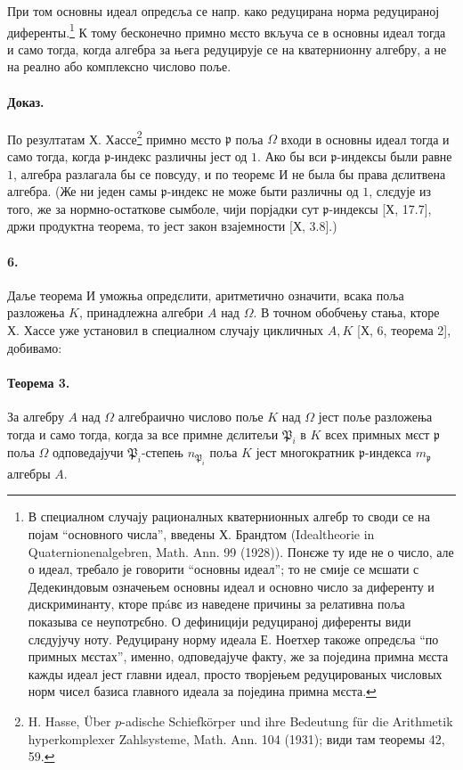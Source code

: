 \documentclass[11pt]{article}
\newcommand{\foreign}[1]{#1}
\begin{document}
При том основны идеал опредєља се напр. како редуцирана норма редуцираној диференты.\footnote{В специалном случају рационалных кватернионных алгебр то своди се на појам ``основного числа'', введены Х. Брандтом (\foreign{Idealtheorie in Quaternionenalgebren, Math. Ann. 99 (1928)}). Понєже ту иде не о число, але о идеал, требало је говорити ``основны идеал''; то не смије се мєшати с Дедекиндовым означењем основны идеал и основно число за диференту и дискриминанту, кторе прáвє из наведене причины за релативна поља показыва се неупотрєбно. О дефиницији редуцираној диференты види слєдујучу ноту. Редуцирану норму идеала Е. Ноетхер такоже опредєља ``по примных мєстах'', именно, одповедајуче факту, же за поједина примна мєста кажды идеал јест главни идеал, просто творјењем редуцированых числовых норм чисел базиса главного идеала за поједина примна мєста.} К тому бесконечно примно мєсто вкључа се в основны идеал тогда и само тогда, когда алгебра за њега редуцирује се на кватернионну алгебру, а не на реално або комплексно числово поље.

\paragraph{Доказ.}
По резултатам Х. Хассе\footnote{\label{fn:p38-hasse-padisch}\foreign{H. Hasse, Über \(p\)-adische Schiefkörper und ihre Bedeutung für die Arithmetik hyperkomplexer Zahlsysteme, Math. Ann. 104 (1931)}; види там теоремы 42, 59.} примно мєсто \(\mathfrak p\) поља \(\Omega\) входи в основны идеал тогда и само тогда, когда \( \mathfrak p\)-индекс различны јест од \(1\). Ако бы вси \( \mathfrak p\)-индексы были равне \(1\), алгебра разлагала бы се повсуду, и по теоремє И не была бы права дєлитвена алгебра. (Же ни једен самы \( \mathfrak p\)-индекс не може быти различны од \(1\), слєдује из того, же за нормно-остаткове сымболе, чији порјадки сут \( \mathfrak p\)-индексы [Х, 17.7], држи продуктна теорема, то јест закон взајемности [Х, 3.8].)

\paragraph{6.}
Даље теорема И уможња опредєлити, аритметично означити, всака поља разложења \(K\), принадлежна алгебри \(A\) над \(\Omega\). В точном обобчењу стања, кторе Х. Хассе уже установил в специалном случају цикличных \(A,K\) [Х, 6, теорема 2], добивамо:

\paragraph{Теорема 3.}
За алгебру \(A\) над \(\Omega\) алгебраично числово поље \(K\) над \(\Omega\) јест поље разложења тогда и само тогда, когда за все примне дєлитељи \(\mathfrak P_i\) в \(K\) всех примных мєст \(\mathfrak p\) поља \(\Omega\) одповедајучи \( \mathfrak P_i\)-степењ \(n_{\mathfrak P_i}\) поља \(K\) јест многократник \( \mathfrak p\)-индекса \(m_{\mathfrak p}\) алгебры \(A\).
\end{document}
